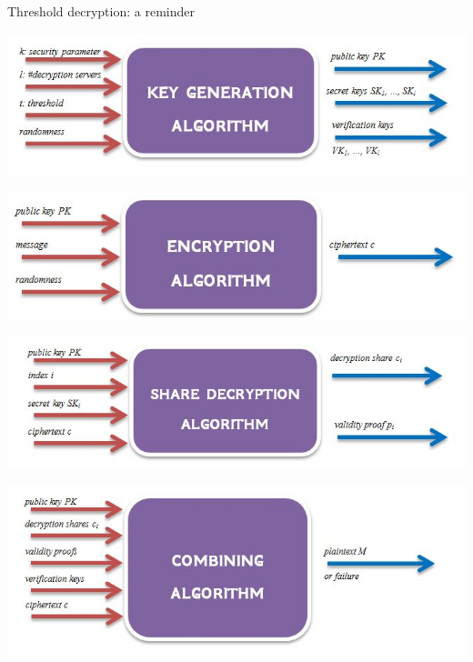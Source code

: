\documentclass{beamer}
\begin{document}
\begin{frame}[allowframebreaks]{Threshold decryption: a reminder}
\begin{center}
\includegraphics[scale=0.35]{threshold1.jpg}
\end{center}
\begin{center}
\includegraphics[scale=0.35]{threshold2.jpg}
\end{center}
\begin{center}
\includegraphics[scale=0.35]{threshold3.jpg}
\end{center}
\begin{center}
\includegraphics[scale=0.35]{threshold4.jpg}
\end{center}
\end{frame}
\end{document}
